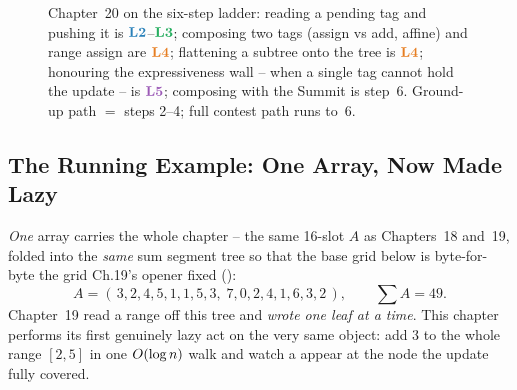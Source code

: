 \begin{figure}[H]
\centering
{}
\caption*{Chapter~20 on the six-step ladder: reading a pending tag and pushing it
is \(\lv2\)--\(\lv3\); composing two tags (assign vs add, affine) and range
assign are \(\lv4\); flattening a subtree onto the tree is \(\lv4\); honouring
the expressiveness wall -- when a single tag cannot hold the update -- is
\(\lv5\); composing with the Summit is step~6.  Ground-up path \(=\) steps 2--4;
full contest path runs to~6.}
\end{figure}

\subsection*{The Running Example: One Array, Now Made Lazy}

\emph{One} array carries the whole chapter -- the same 16-slot \(A\) as
Chapters~18 and~19, folded into the \emph{same} sum segment tree so that the
base grid below is byte-for-byte the grid Ch.19's opener fixed
():
\[
  A=(\,3,2,4,5,1,1,5,3,\;7,0,2,4,1,6,3,2\,),\qquad \textstyle\sum A = 49 .
\]
Chapter~19 read a range off this tree and \emph{wrote one leaf at a time}.  This
chapter performs its first genuinely lazy act on the very same object: add
\(3\) to the whole range \([2,5]\) in one \(O(\log n)\) walk and watch a
 appear at the node the update fully covered.


